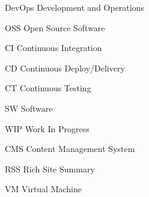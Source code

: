  \begin{siglas}
  \item[DevOps] Development and Operations
  \item[OSS] Open Source Software
  \item[CI] Continuous Integration
  \item[CD] Continuous Deploy/Delivery
  \item[CT] Continuous Testing
  \item[SW] Software
  \item[WIP] Work In Progress
  \item[CMS] Content Management System  
  \item[RSS] Rich Site Summary
  \item[VM] Virtual Machine 
\end{siglas}
